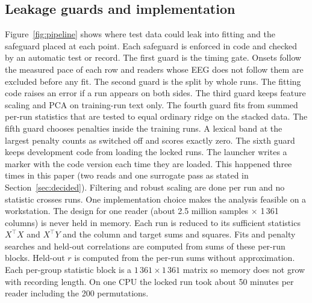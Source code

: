 \documentclass[sigconf]{acmart}
\begin{document}
\subsection{Leakage guards and implementation}
Figure~\ref{fig:pipeline} shows where test data could leak into fitting and the safeguard placed at each point. Each safeguard is enforced in code and checked by an automatic test or record. The first guard is the timing gate. Onsets follow the measured pace of each row and readers whose EEG does not follow them are excluded before any fit. The second guard is the split by whole runs. The fitting code raises an error if a run appears on both sides. The third guard keeps feature scaling and PCA on training-run text only. The fourth guard fits from summed per-run statistics that are tested to equal ordinary ridge on the stacked data. The fifth guard chooses penalties inside the training runs. A lexical band at the largest penalty counts as switched off and scores exactly zero. The sixth guard keeps development code from loading the locked runs. The launcher writes a marker with the code version each time they are loaded. This happened three times in this paper (two reads and one surrogate pass as stated in Section~\ref{sec:decided}). Filtering and robust scaling are done per run and no statistic crosses runs. One implementation choice makes the analysis feasible on a workstation. The design for one reader (about 2.5 million samples $\times$ 1\,361 columns) is never held in memory. Each run is reduced to its sufficient statistics $X^\top X$ and $X^\top Y$ and the column and target sums and squares. Fits and penalty searches and held-out correlations are computed from sums of these per-run blocks. Held-out $r$ is computed from the per-run sums without approximation. Each per-group statistic block is a $1\,361 \times 1\,361$ matrix so memory does not grow with recording length. On one CPU the locked run took about 50 minutes per reader including the 200 permutations.
\end{document}
